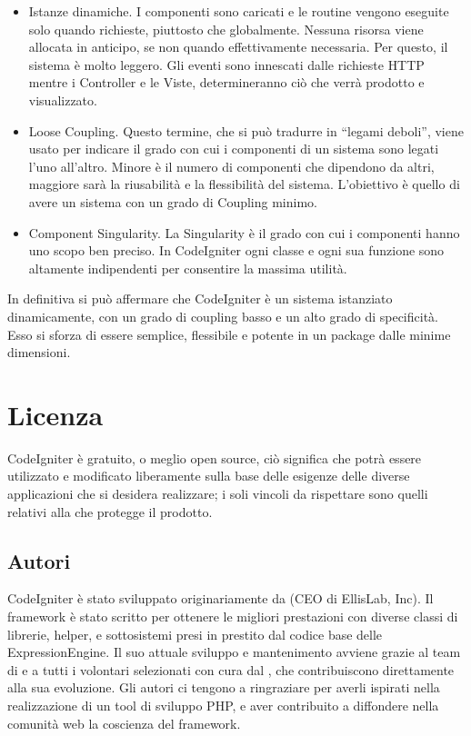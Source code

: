 \begin{itemize}
\item Istanze dinamiche. I componenti sono caricati e le routine vengono eseguite solo quando richieste, piuttosto che globalmente. Nessuna risorsa viene allocata in anticipo, se non quando effettivamente necessaria. Per questo, il sistema è molto leggero. Gli eventi sono innescati dalle richieste \ac{HTTP} mentre i Controller e le Viste, determineranno ciò che verrà prodotto e visualizzato.
\item Loose Coupling. Questo termine, che si può tradurre in ``legami deboli'', viene usato per indicare il grado con cui i componenti di un sistema sono legati l'uno all'altro. Minore è il numero di componenti che dipendono da altri, maggiore sarà la riusabilità e la flessibilità del sistema. L'obiettivo è quello di avere un sistema con un grado di Coupling minimo.
\item Component Singularity. La Singularity è il grado con cui i componenti hanno uno scopo ben preciso. In CodeIgniter ogni classe e ogni sua funzione sono altamente indipendenti per consentire la massima utilità.
\end{itemize}

In definitiva si può affermare che CodeIgniter è un sistema istanziato dinamicamente, con un grado di coupling basso e un alto grado di specificità. Esso si sforza di essere semplice, flessibile e potente in un package dalle minime dimensioni.

\section*{Licenza}
CodeIgniter è gratuito, o meglio open source, ciò significa che potrà essere utilizzato e modificato liberamente sulla base delle esigenze delle diverse applicazioni che si desidera realizzare; i soli vincoli da rispettare sono quelli relativi alla  che protegge il prodotto.

\subsection*{Autori}
CodeIgniter è stato sviluppato originariamente da  (CEO di EllisLab, Inc). Il framework è stato scritto per ottenere le migliori prestazioni con diverse classi di librerie, helper, e sottosistemi presi in prestito dal codice base delle ExpressionEngine. Il suo attuale sviluppo e mantenimento avviene grazie al team di  e a tutti i volontari selezionati con cura dal , che contribuiscono direttamente alla sua evoluzione. Gli autori ci tengono a ringraziare  per averli ispirati nella realizzazione di un tool di sviluppo \ac{PHP}, e aver contribuito a diffondere nella comunità web la coscienza del framework.

